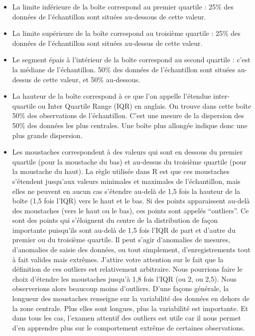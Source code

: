 \documentclass[
  a4paper,
]{article}
\providecommand{\tightlist}{%
  \setlength{\itemsep}{0pt}\setlength{\parskip}{0pt}}
\begin{document}
\begin{itemize}
\tightlist
\item
  La limite inférieure de la boîte correspond au premier quartile : 25\% des données de l'échantillon sont situées au-dessous de cette valeur.
\item
  La limite supérieure de la boîte correspond au troisième quartile : 25\% des données de l'échantillon sont situées au-dessus de cette valeur.
\item
  Le segment épais à l'intérieur de la boîte correspond au second quartile : c'est la médiane de l'échantillon. 50\% des données de l'échantillon sont situées au-dessus de cette valeur, et 50\% au-dessous.
\item
  La hauteur de la boîte correspond à ce que l'on appelle l'étendue inter-quartile ou Inter Quartile Range (IQR) en anglais. On trouve dans cette boîte 50\% des observations de l'échantillon. C'est une mesure de la dispersion des 50\% des données les plus centrales. Une boîte plus allongée indique donc une plus grande dispersion.
\item
  Les moustaches correspondent à des valeurs qui sont en dessous du premier quartile (pour la moustache du bas) et au-dessus du troisième quartile (pour la moustache du haut). La règle utilisée dans R est que ces moustaches s'étendent jusqu'aux valeurs minimales et maximales de l'échantillon, mais elles ne peuvent en aucun cas s'étendre au-delà de 1,5 fois la hauteur de la boîte (1,5 fois l'IQR) vers le haut et le bas. Si des points apparaissent au-delà des moustaches (vers le haut ou le bas), ces points sont appelés ``outliers''. Ce sont des points qui s'éloignent du centre de la distribution de façon importante puisqu'ils sont au-delà de 1,5 fois l'IQR de part et d'autre du premier ou du troisième quartile. Il peut s'agir d'anomalies de mesures, d'anomalies de saisie des données, ou tout simplement, d'enregistrements tout à fait valides mais extrêmes. J'attire votre attention sur le fait que la définition de ces outliers est relativement arbitraire. Nous pourrions faire le choix d'étendre les moustaches jusqu'à 1,8 fois l'IQR (ou 2, ou 2,5). Nous observerions alors beaucoup moins d'outliers. D'une façons générale, la longueur des moustaches renseigne sur la variabilité des données en dehors de la zone centrale. Plus elles sont longues, plus la variabilité est importante. Et dans tous les cas, l'examen attentif des outliers est utile car il nous permet d'en apprendre plus sur le comportement extrême de certaines observations.
\end{itemize}
\end{document}
